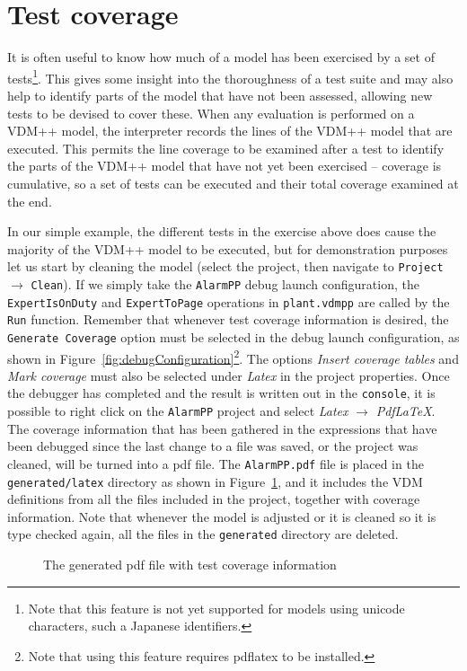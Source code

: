 \section{Test coverage}\label{sec:testcov}
It is often useful to know how much of a model has been exercised by a set of tests\footnote{Note that this feature is not yet supported for   models using unicode characters, such a Japanese identifiers.}. This gives some insight into the thoroughness of a test suite and may also help to identify parts of the model that have not been assessed, allowing new tests to be devised to cover these. When any evaluation is performed on a VDM++ model, the interpreter records the lines of the VDM++ model that are executed. This permits the line coverage to be examined after a test to identify the parts of the VDM++ model that have not yet been exercised -- coverage is cumulative, so a set of tests can be executed and their total coverage examined at the end.

In our simple example, the different tests in the exercise above does cause the majority of the VDM++ model to be executed, but for demonstration purposes let us start by cleaning the model (select the project, then navigate to \texttt{Project} $\rightarrow$ \texttt{Clean}). If we simply take the \texttt{AlarmPP} debug launch configuration, the \verb|ExpertIsOnDuty| and \verb|ExpertToPage| operations in \verb|plant.vdmpp| are called by the \texttt{Run} function. Remember that whenever test coverage information is desired, the \texttt{Generate Coverage} option must be selected in the debug launch configuration, as shown in Figure~\ref{fig:debugConfiguration}\footnote{Note that using this feature requires pdflatex to be installed.}.  The options \emph{Insert coverage tables} and \emph{Mark coverage} must also be selected under \emph{Latex} in the project properties.  Once the debugger has completed and the result is written out in the \texttt{console}, it is possible to right click on the \texttt{AlarmPP} project and select \emph{Latex} $ \rightarrow $ \emph{PdfLaTeX}. The coverage information that has been gathered in the expressions that have been debugged since the last change to a file was saved, or the project was cleaned, will be turned into a pdf file. The \texttt{AlarmPP.pdf} file is placed in the \texttt{generated/latex} directory as shown in Figure~\ref{fig:testcov}, and it includes the
VDM definitions from all the files included in the project, together with coverage information. Note that whenever the model is adjusted or it is cleaned so it is type checked again, all the files in the \texttt{generated} directory are deleted.
%
\begin{figure}[tb]
\begin{center}
\end{center}
\caption{The generated pdf file with test coverage information\label{fig:testcov}}
\end{figure}

